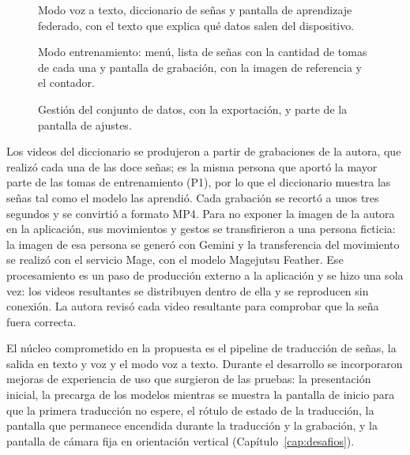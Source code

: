 \begin{figure}[p]
    \centering
    \hfill
    \hfill
    \caption{Modo voz a texto, diccionario de señas y pantalla de aprendizaje federado, con el texto que explica qué datos salen del dispositivo.}
    \label{fig:pantallas-voz}
\end{figure}

\begin{figure}[p]
    \centering
    \hfill
    \hfill
    \caption{Modo entrenamiento: menú, lista de señas con la cantidad de tomas de cada una y pantalla de grabación, con la imagen de referencia y el contador.}
    \label{fig:pantallas-entrenamiento}
\end{figure}

\begin{figure}[p]
    \centering
    \hspace{0.04\textwidth}
    \caption{Gestión del conjunto de datos, con la exportación, y parte de la pantalla de ajustes.}
    \label{fig:pantallas-ajustes}
\end{figure}

Los videos del diccionario se produjeron a partir de grabaciones de la autora, que realizó cada una de las doce señas; es la misma persona que aportó la mayor parte de las tomas de entrenamiento (P1), por lo que el diccionario muestra las señas tal como el modelo las aprendió. Cada grabación se recortó a unos tres segundos y se convirtió a formato MP4. Para no exponer la imagen de la autora en la aplicación, sus movimientos y gestos se transfirieron a una persona ficticia: la imagen de esa persona se generó con Gemini y la transferencia del movimiento se realizó con el servicio Mage, con el modelo Magejutsu Feather. Ese procesamiento es un paso de producción externo a la aplicación y se hizo una sola vez: los videos resultantes se distribuyen dentro de ella y se reproducen sin conexión. La autora revisó cada video resultante para comprobar que la seña fuera correcta.

El núcleo comprometido en la propuesta es el pipeline de traducción de señas, la salida en texto y voz y el modo voz a texto. Durante el desarrollo se incorporaron mejoras de experiencia de uso que surgieron de las pruebas: la presentación inicial, la precarga de los modelos mientras se muestra la pantalla de inicio para que la primera traducción no espere, el rótulo de estado de la traducción, la pantalla que permanece encendida durante la traducción y la grabación, y la pantalla de cámara fija en orientación vertical (Capítulo~\ref{cap:desafios}).
